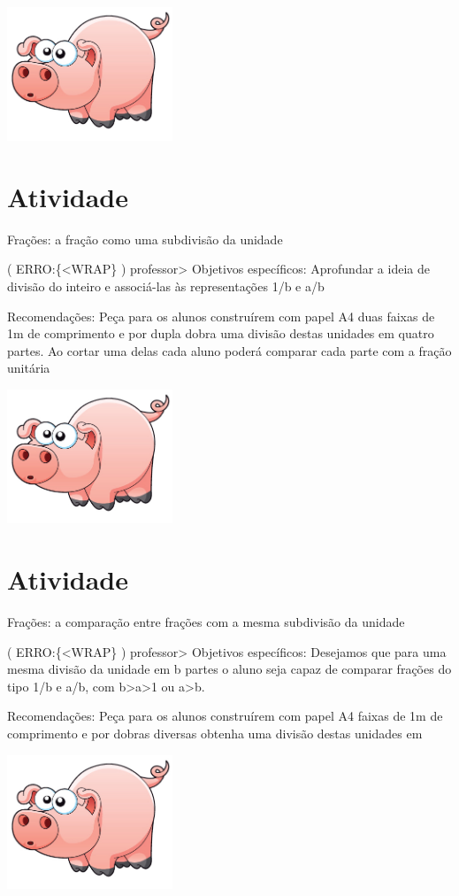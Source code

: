 \documentclass[a4,12pt]{book}
\begin{document}
\includegraphics[width=\textwidth,height=4cm, keepaspectratio]{pig}
\section{Atividade}



Frações: a fração como uma subdivisão da unidade

( ERRO:\{<WRAP\} ) professor>
Objetivos específicos:
Aprofundar a ideia de divisão do inteiro e associá-las às representações 1/b e a/b

Recomendações:
Peça para os alunos construírem com papel A4 duas faixas de 1m de comprimento e por dupla dobra uma divisão destas unidades em quatro partes.  Ao cortar uma delas cada aluno poderá comparar cada parte com a fração unitária


\includegraphics[width=\textwidth,height=4cm, keepaspectratio]{pig}
\section{Atividade}



Frações: a comparação entre frações com a mesma subdivisão da unidade

( ERRO:\{<WRAP\} ) professor>
Objetivos específicos:
Desejamos que para uma mesma divisão da unidade em b partes o aluno seja capaz de comparar frações do tipo 1/b e a/b, com b>a>1 ou a>b.

Recomendações:
Peça para os alunos construírem com papel A4 faixas de 1m de comprimento e por dobras diversas obtenha uma divisão destas unidades em


\includegraphics[width=\textwidth,height=4cm, keepaspectratio]{pig}
\end{document}
